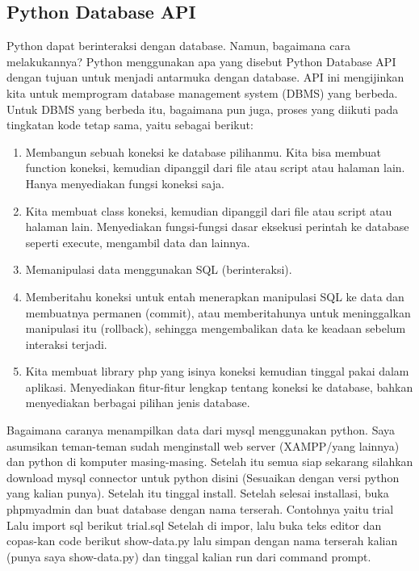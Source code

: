 \subsection {Python Database API} 
	Python dapat berinteraksi dengan database. Namun, bagaimana cara melakukannya? Python menggunakan apa yang disebut Python Database API dengan tujuan untuk menjadi antarmuka dengan database. API ini mengijinkan kita untuk memprogram database management system (DBMS) yang berbeda. Untuk DBMS yang berbeda itu, bagaimana pun juga, proses yang diikuti pada tingkatan kode tetap sama, yaitu sebagai berikut: 
	\begin{enumerate}
		\item Membangun sebuah koneksi ke database pilihanmu. Kita bisa membuat function koneksi, kemudian dipanggil dari file atau script atau halaman lain. Hanya menyediakan fungsi koneksi saja. 
		\item Kita membuat class koneksi, kemudian dipanggil dari file atau script atau halaman lain.
Menyediakan fungsi-fungsi dasar eksekusi perintah ke database seperti execute, mengambil data dan lainnya.
		\item Memanipulasi data menggunakan SQL (berinteraksi). 
		\item Memberitahu koneksi untuk entah menerapkan manipulasi SQL ke data dan membuatnya permanen (commit), atau memberitahunya untuk meninggalkan manipulasi itu (rollback), sehingga mengembalikan data ke keadaan sebelum interaksi terjadi. 
		\item Kita membuat library php yang isinya koneksi kemudian tinggal pakai dalam aplikasi. Menyediakan fitur-fitur lengkap tentang koneksi ke database, bahkan menyediakan berbagai pilihan jenis database.
	\end{enumerate}
	
Bagaimana caranya menampilkan data dari mysql menggunakan python. Saya asumsikan teman-teman sudah menginstall web server (XAMPP/yang lainnya) dan python di komputer masing-masing. Setelah itu semua siap sekarang silahkan download mysql connector untuk python disini (Sesuaikan dengan versi python yang kalian punya). Setelah itu tinggal install. Setelah selesai installasi, buka phpmyadmin dan buat database dengan nama terserah. Contohnya yaitu trial Lalu import sql berikut
	trial.sql 
	Setelah di impor, lalu buka teks editor dan copas-kan code berikut 
	show-data.py 
	lalu simpan dengan nama terserah kalian (punya saya show-data.py) dan tinggal 
	kalian run dari command prompt. 

